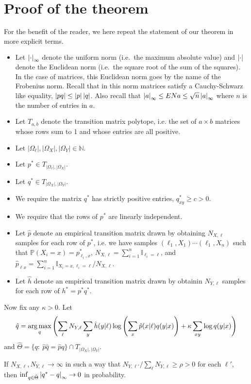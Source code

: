 \section{Proof of the theorem}

\label{sec:proof}

For the benefit of the reader, we here repeat the statement of our theorem in more explicit terms.  

\begin{itemize}
\item Let $\left|\cdot\right|_\infty$ denote the uniform norm (i.e.\ the maximum absolute value) and $\left|\cdot\right|$ denote the Euclidean norm (i.e.\ the square root of the sum of the squares).  In the case of matrices, this Euclidean norm goes by the name of the Frobenius norm.  Recall that in this norm matrices satisfy a Cauchy-Schwarz like equality, $\left|pq\right|\leq\left|p\right|\left|q\right|$.  Also recall that $\left|a\right|_\infty \leq EN{a} \leq \sqrt{n}\left|a\right|_\infty$ where $n$ is the number of entries in $a$.
\item Let $T_{a,b}$ denote the transition matrix polytope, i.e. the set of $a\times b$ matrices whose rows sum to 1 and whose entries are all positive.
\item Let $|\Omega_\ell|,|\Omega_X|,|\Omega_Y| \in \mathbb{N}$.
\item Let $p^*\in T_{|\Omega_\ell|,|\Omega_X|}$.
\item Let $q^*\in T_{|\Omega_X|,|\Omega_Y|}$.
\item We require the matrix $q^*$ has strictly positive entries, $q^*_{xy}\geq c>0$.
\item We require that the rows of $p^*$ are linearly independent.
\item Let $\hat p$ denote an empirical transition matrix drawn by obtaining $N_{X,\ell}$ samples for each row of $p^*$, i.e. we have samples $(\ell_1,X_1) \cdots (\ell_1,X_n)$ such that $\mathbb{P}(X_i=x) = p^*_{\ell_i,x}$, $N_{X,\ell}=\sum_{i=1}^n \mathbb{I}_{\ell_i=\ell}$, and $\hat p_{\ell x} = \sum_{i=1}^n \mathbb{I}_{X_i=x,\ell_i=\ell} / N_{X,\ell}$. 
\item Let $\hat h$ denote an empirical transition matrix drawn by obtainin $N_{Y,\ell}$ samples for each row of $h^*=p^*q^*$.  
\end{itemize}

Now fix any $\kappa>0$.  Let
\begin{align}
\hat q = \operatorname*{arg\,max}_q \left(\sum_\ell N_{Y,\ell}\sum_{y}\hat h(y|\ell)\log\left(\sum_{x}\hat p(x|\ell)q(y|x)\right) + \kappa \sum_{xy} \log q(y|x)\right)\label{eq:mindef}
\end{align}
and $\hat \Theta=\{q:\ \hat p\hat q=\hat pq\} \cap T_{|\Omega_X|,|\Omega_Y|}$.  
\vspace{.1in}
\begin{thm}
If $N_{X,\ell},N_{Y,\ell}\rightarrow \infty$ in such a way that $N_{Y,\ell'}/\sum_{\ell}N_{Y,\ell} \geq \rho>0$ for each $\ell'$, then $\inf_{q\in \hat\Theta} \left|q^*-q\right|_\infty\rightarrow 0$ in probability.
\end{thm}

